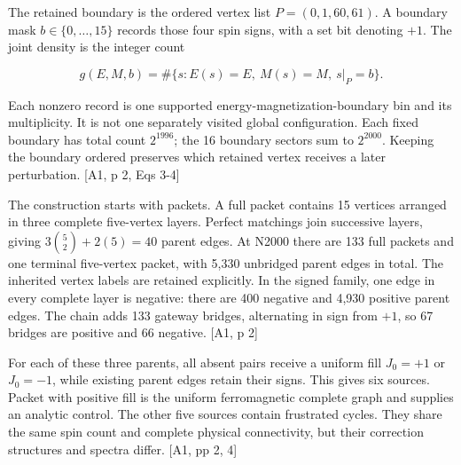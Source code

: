 The retained boundary is the ordered vertex list \(P=(0,1,60,61)\). A boundary mask \(b\in\{0,\ldots,15\}\) records those four spin signs, with a set bit denoting \(+1\). The joint density is the integer count

\[g(E,M,b)=\#\{s:E(s)=E,\ M(s)=M,\ s|_P=b\}.\]

Each nonzero record is one supported energy-magnetization-boundary bin and its multiplicity. It is not one separately visited global configuration. Each fixed boundary has total count \(2^{1996}\); the 16 boundary sectors sum to \(2^{2000}\). Keeping the boundary ordered preserves which retained vertex receives a later perturbation. {[}A1, p 2, Eqs 3-4{]}

The construction starts with packets. A full packet contains 15 vertices arranged in three complete five-vertex layers. Perfect matchings join successive layers, giving \(3\binom{5}{2}+2(5)=40\) parent edges. At N2000 there are 133 full packets and one terminal five-vertex packet, with 5,330 unbridged parent edges in total. The inherited vertex labels are retained explicitly. In the signed family, one edge in every complete layer is negative: there are 400 negative and 4,930 positive parent edges. The chain adds 133 gateway bridges, alternating in sign from \(+1\), so 67 bridges are positive and 66 negative. {[}A1, p 2{]}

For each of these three parents, all absent pairs receive a uniform fill \(J_0=+1\) or \(J_0=-1\), while existing parent edges retain their signs. This gives six sources. Packet with positive fill is the uniform ferromagnetic complete graph and supplies an analytic control. The other five sources contain frustrated cycles. They share the same spin count and complete physical connectivity, but their correction structures and spectra differ. {[}A1, pp 2, 4{]}

